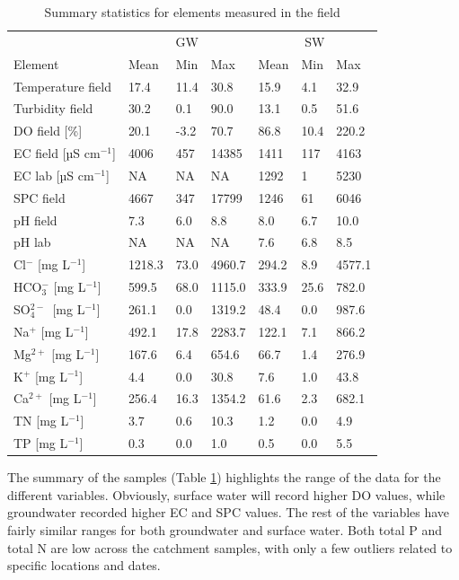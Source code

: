 \documentclass[, manuscript]{copernicus}
\begin{document}
\begin{table}
\centering
\caption{\label{tab:TableElementstats}Summary statistics for elements measured in the field}
\centering
\begin{tabular}[t]{l|l|l|l|l|l|l}
\hline
\multicolumn{1}{c|}{} & \multicolumn{3}{c|}{GW} & \multicolumn{3}{c}{SW} \\
\cline{2-4} \cline{5-7}
Element & Mean & Min & Max & Mean & Min & Max\\
\hline
Temperature field & 17.4 & 11.4 & 30.8 & 15.9 & 4.1 & 32.9\\
\hline
Turbidity field & 30.2 & 0.1 & 90.0 & 13.1 & 0.5 & 51.6\\
\hline
DO field [\%] & 20.1 & -3.2 & 70.7 & 86.8 & 10.4 & 220.2\\
\hline
EC field [µS cm$^{-1}$] & 4006 & 457 & 14385 & 1411 & 117 & 4163\\
\hline
EC lab [µS cm$^{-1}$] & NA & NA & NA & 1292 & 1 & 5230\\
\hline
SPC field & 4667 & 347 & 17799 & 1246 & 61 & 6046\\
\hline
pH field & 7.3 & 6.0 & 8.8 & 8.0 & 6.7 & 10.0\\
\hline
pH lab & NA & NA & NA & 7.6 & 6.8 & 8.5\\
\hline
Cl$^-$ [mg L$^{-1}$] & 1218.3 & 73.0 & 4960.7 & 294.2 & 8.9 & 4577.1\\
\hline
HCO$_3^-$ [mg L$^{-1}$] & 599.5 & 68.0 & 1115.0 & 333.9 & 25.6 & 782.0\\
\hline
SO$_4^{2-}$~[mg L$^{-1}$] & 261.1 & 0.0 & 1319.2 & 48.4 & 0.0 & 987.6\\
\hline
Na$^{+}$ [mg L$^{-1}$] & 492.1 & 17.8 & 2283.7 & 122.1 & 7.1 & 866.2\\
\hline
Mg$^{2+}$ [mg L$^{-1}$] & 167.6 & 6.4 & 654.6 & 66.7 & 1.4 & 276.9\\
\hline
K$^{+}$ [mg L$^{-1}$] & 4.4 & 0.0 & 30.8 & 7.6 & 1.0 & 43.8\\
\hline
Ca$^{2+}$ [mg L$^{-1}$] & 256.4 & 16.3 & 1354.2 & 61.6 & 2.3 & 682.1\\
\hline
TN [mg L$^{-1}$] & 3.7 & 0.6 & 10.3 & 1.2 & 0.0 & 4.9\\
\hline
TP [mg L$^{-1}$] & 0.3 & 0.0 & 1.0 & 0.5 & 0.0 & 5.5\\
\hline
\end{tabular}
\end{table}

The summary of the samples (Table \ref{tab:TableElementstats})
highlights the range of the data for the different variables. Obviously,
surface water will record higher DO values, while groundwater recorded
higher EC and SPC values. The rest of the variables have fairly similar
ranges for both groundwater and surface water. Both total P and total N
are low across the catchment samples, with only a few outliers related
to specific locations and dates.
\end{document}
